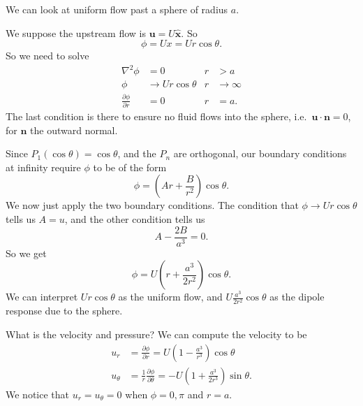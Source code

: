 \documentclass[a4paper]{article}
\begin{document}
\begin{eg}
  We can look at uniform flow past a sphere of radius $a$.
  \begin{center}
  \end{center}
  We suppose the upstream flow is $\mathbf{u} = U \hat{\mathbf{x}}$. So
  \[
    \phi = Ux = Ur\cos \theta.
  \]
  So we need to solve
  \begin{align*}
    \nabla^2 \phi &= 0 & r &>a\\
    \phi&\to Ur \cos \theta & r &\to \infty\\
    \frac{\partial \phi}{\partial r}&= 0 & r&=a.
  \end{align*}
  The last condition is there to ensure no fluid flows into the sphere, i.e.\ $\mathbf{u}\cdot \mathbf{n} = 0$, for $\mathbf{n}$ the outward normal.

  Since $P_1(\cos \theta) = \cos \theta$, and the $P_n$ are orthogonal, our boundary conditions at infinity require $\phi$ to be of the form
  \[
    \phi = \left(Ar + \frac{B}{r^2}\right) \cos \theta.
  \]
  We now just apply the two boundary conditions. The condition that $\phi \to Ur \cos \theta$ tells us $A = u$, and the other condition tells us
  \[
    A - \frac{2B}{a^3} = 0.
  \]
  So we get
  \[
    \phi = U\left(r + \frac{a^3}{2r^2}\right) \cos \theta.
  \]
  We can interpret $Ur \cos \theta$ as the uniform flow, and $U \frac{a^3}{2r^2} \cos \theta$ as the dipole response due to the sphere.

  What is the velocity and pressure? We can compute the velocity to be
  \begin{align*}
    u_r &= \frac{\partial \phi}{\partial r} = U\left(1 - \frac{a^3}{r^3}\right) \cos \theta\\
    u_\theta &= \frac{1}{r} \frac{\partial \phi}{\partial \theta} = -U\left(1 + \frac{a^3}{2r^3}\right)\sin \theta.
  \end{align*}
  We notice that $u_r = u_\theta = 0$ when $\phi = 0, \pi$ and $r = a$.


\end{eg}
\end{document}
